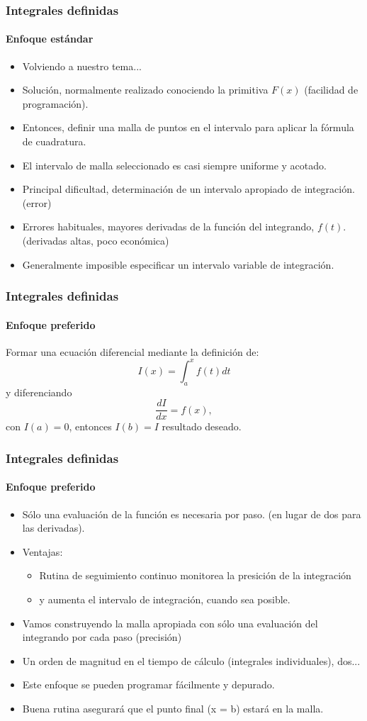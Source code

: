 \documentclass{beamer}
\begin{document}
\frame
{
\frametitle{Integrales definidas}
\framesubtitle{Enfoque estándar}
\begin{itemize}
	\item Volviendo a nuestro tema...
	\item Solución, normalmente realizado conociendo la primitiva $F(x)$ (facilidad de programación).
	\item Entonces, definir una malla de puntos en el intervalo para aplicar la fórmula de cuadratura.
	\item El intervalo de malla seleccionado es casi siempre uniforme y acotado.
	\item Principal dificultad, determinación de un intervalo apropiado de integración. (error)
	\item Errores habituales, mayores derivadas de la función del integrando, $f(t)$. (derivadas altas, poco económica)
	\item Generalmente imposible especificar un intervalo variable de integración.
\end{itemize}
}

\frame
{
\frametitle{Integrales definidas}
\framesubtitle{Enfoque preferido}
Formar una ecuación diferencial mediante la definición de:
$$  I(x) = \int_{a}^{x} f(t) dt $$
y diferenciando
$$  \frac{dI}{dx} = f(x), $$
con $I(a) = 0$, entonces $I(b) = I$
resultado deseado.
}

\frame
{
\frametitle{Integrales definidas}
\framesubtitle{Enfoque preferido}
\begin{itemize}
	\item Sólo una evaluación de la función es necesaria por paso. (en lugar de dos para las derivadas).
	\item Ventajas:
	\begin{itemize}
		\item Rutina de seguimiento continuo monitorea la presición de la integración
		\item y aumenta el intervalo de integración, cuando sea posible.
	\end{itemize}
	\item Vamos construyendo la malla apropiada con sólo una evaluación del integrando por cada paso (precisión)
	\item Un orden de magnitud en el tiempo de cálculo (integrales individuales), dos...
	\item Este enfoque se pueden programar fácilmente y depurado.
	\item Buena rutina asegurará que el punto final (x = b) estará en la malla.
\end{itemize}
}
\end{document}
